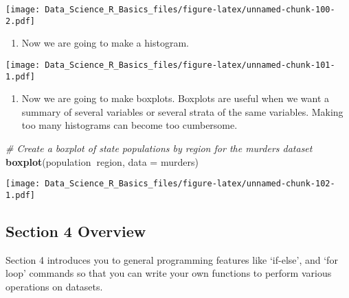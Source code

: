 \documentclass[]{article}
\newenvironment{Shaded}{\begin{snugshade}}{\end{snugshade}}
\newcommand{\CommentTok}[1]{\textcolor[rgb]{0.56,0.35,0.01}{\textit{#1}}}
\newcommand{\DataTypeTok}[1]{\textcolor[rgb]{0.13,0.29,0.53}{#1}}
\newcommand{\DecValTok}[1]{\textcolor[rgb]{0.00,0.00,0.81}{#1}}
\newcommand{\KeywordTok}[1]{\textcolor[rgb]{0.13,0.29,0.53}{\textbf{#1}}}
\newcommand{\NormalTok}[1]{#1}
\newcommand{\OperatorTok}[1]{\textcolor[rgb]{0.81,0.36,0.00}{\textbf{#1}}}
\newcommand{\StringTok}[1]{\textcolor[rgb]{0.31,0.60,0.02}{#1}}
\providecommand{\tightlist}{%
  \setlength{\itemsep}{0pt}\setlength{\parskip}{0pt}}
\begin{document}
\texttt{[image: Data\_Science\_R\_Basics\_files/figure-latex/unnamed-chunk-100-2.pdf]}

\begin{enumerate}
\def\labelenumi{\arabic{enumi}.}
\setcounter{enumi}{1}
\tightlist
\item
  Now we are going to make a histogram.
\end{enumerate}

\begin{Shaded}
\end{Shaded}

\texttt{[image: Data\_Science\_R\_Basics\_files/figure-latex/unnamed-chunk-101-1.pdf]}

\begin{enumerate}
\def\labelenumi{\arabic{enumi}.}
\setcounter{enumi}{2}
\tightlist
\item
  Now we are going to make boxplots. Boxplots are useful when we want a
  summary of several variables or several strata of the same variables.
  Making too many histograms can become too cumbersome.
\end{enumerate}

\begin{Shaded}
\begin{Highlighting}[]
\CommentTok{# Create a boxplot of state populations by region for the murders dataset}
\KeywordTok{boxplot}\NormalTok{(population}\OperatorTok{~}\NormalTok{region, }\DataTypeTok{data =}\NormalTok{ murders)}
\end{Highlighting}
\end{Shaded}

\texttt{[image: Data\_Science\_R\_Basics\_files/figure-latex/unnamed-chunk-102-1.pdf]}

\hypertarget{section-4-overview}{%
\subsection{Section 4 Overview}\label{section-4-overview}}

Section 4 introduces you to general programming features like `if-else',
and `for loop' commands so that you can write your own functions to
perform various operations on datasets.
\end{document}
